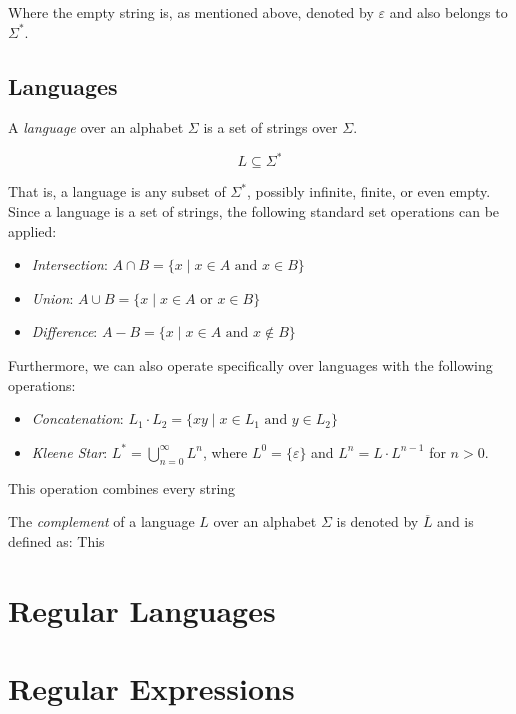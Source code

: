 Where the empty string is, as mentioned above, denoted by $\varepsilon$ and also belongs to $\Sigma^*$.

\subsection*{Languages}

A \emph{language} over an alphabet $\Sigma$ is a set of strings over $\Sigma$.

\[
L \subseteq \Sigma^*
\]

That is, a language is any subset of $\Sigma^*$, possibly infinite, finite, or even empty. \newline
Since a language is a set of strings, the following standard set operations can be applied: %
\begin{itemize}
	\item \emph{Intersection}: $A \cap B = \{ x \mid x \in A \text{ and } x \in B \}$
	\item \emph{Union}: $A \cup B = \{ x \mid x \in A \text{ or } x \in B \}$
	\item \emph{Difference}: $A - B = \{ x \mid x \in A \text{ and } x \notin B \}$
\end{itemize}

Furthermore, we can also operate specifically over languages with the following operations:

\begin{itemize}
	\item \emph{Concatenation}: $L_1 \cdot L_2 = \{ xy \mid x \in L_1 \text{ and } y \in L_2 \}$
	\item \emph{Kleene Star}: $L^* = \bigcup_{n=0}^{\infty} L^n$, where $L^0 = \{\varepsilon\}$ and $L^n = L \cdot L^{n-1}$ for $n > 0$.
\end{itemize}


This operation combines every string

The \emph{complement} of a language $L$ over an alphabet $\Sigma$ is denoted by $\overline{L}$ and is defined as:
This

\section{Regular Languages}

\section{Regular Expressions}

